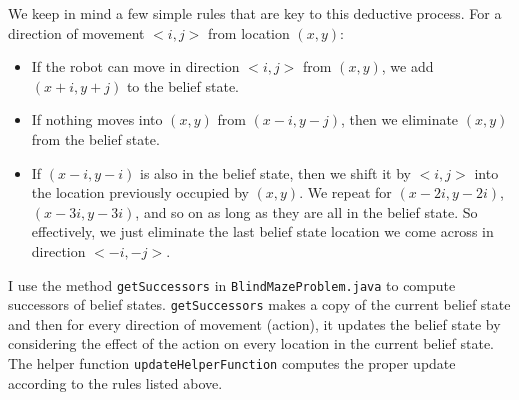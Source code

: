 \documentclass{article}
\begin{document}
We keep in mind a few simple rules that are key to this deductive process. For a direction of movement $<i, j>$ from location $(x, y)$:

\begin{itemize}
  \item If the robot can move in direction $<i, j>$ from $(x, y)$, we add $(x + i, y + j)$ to the belief state.
  \item If nothing moves into $(x, y)$ from $(x - i, y - j)$, then we eliminate $(x, y)$ from the belief state.
  \item If $(x - i, y - i)$ is also in the belief state, then we shift it by $<i, j>$ into the location previously occupied by $(x, y)$. We repeat for $(x - 2i, y - 2i)$, $(x - 3i, y - 3i)$, and so on as long as they are all in the belief state. So effectively, we just eliminate the last belief state location we come across in direction $<-i, -j>$.
\end{itemize}

I use the method \verb`getSuccessors` in \verb`BlindMazeProblem.java` to compute successors of belief states. \verb`getSuccessors` makes a copy of the current belief state and then for every direction of movement (action), it updates the belief state by considering the effect of the action on every location in the current belief state. The helper function \verb`updateHelperFunction` computes the proper update according to the rules listed above.
\end{document}
